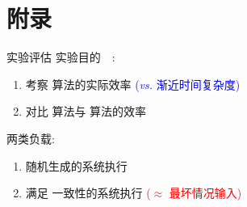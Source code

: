 
\section{附录}

\appendix

\begin{frame}{实验评估}
  实验目的~\footnotemark[1]~:
  \begin{enumerate}
    \item 考察 \readcentric{} 算法的实际效率 
      \textcolor{blue}{\small ({\it vs.} 渐近时间复杂度)}
    \item 对比 \readcentric{} 算法与 \rwclosure{} 算法的效率
  \end{enumerate}

  \pause
  \vspace{0.50cm}

  两类负载:
  \begin{enumerate}
    \item 随机生成的系统执行
    \item 满足 \PRAM{} 一致性的系统执行 \textcolor{red}{\small ($\approx$ 最坏情况输入)}
  \end{enumerate}
\end{frame}

